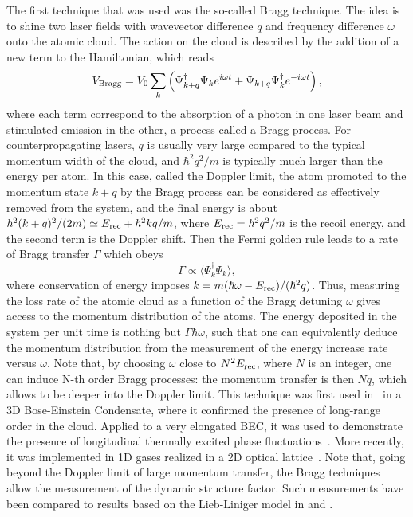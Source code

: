 \documentclass[onecolumn,amsfonts,showpacs,superscriptaddress]{revtex4-1}
\newcommand{\comJ}[1]{{\color{orange}#1}}
\begin{document}
The first technique that was used %
was the so-called Bragg technique. The idea is to shine two laser fields with wavevector difference $q$ and frequency difference $\omega$ onto the atomic cloud. 
The action on the cloud is described by the addition of a new term to the Hamiltonian, which reads 
\begin{equation}
    V_{\rm Bragg} = V_0\sum_k \left ( \Psi_{k+q}^\dagger \Psi_k e^{i\omega t}
    +\Psi_{k+q}\Psi_k^\dagger e^{-i\omega t}
    \right ),
\end{equation}
where each term correspond to the
 absorption of a photon in one laser beam and stimulated emission in the other, a process called a Bragg process. 
 For counterpropagating lasers, 
 $q$ is usually very large compared to the typical momentum width of the cloud, and $\hbar^2q^2/m$ is typically much larger than the energy per atom. In this case, called the Doppler limit, the 
 atom promoted to the momentum state $k+q$ by the Bragg process can be considered as effectively removed from the system, and the
 final energy is about 
 $\hbar^2(k+q)^2/(2m)\simeq E_{\rm rec} + \hbar^2 kq/m$, where $E_{\rm rec}=\hbar^2q^2/m$ is the recoil energy, and the second term is the Doppler shift.
Then the Fermi golden rule leads to a rate of Bragg transfer $\Gamma$ which obeys   %
\begin{equation}
    \Gamma \propto \langle \Psi_k^\dagger \Psi_k\rangle ,
\end{equation}
where conservation of energy imposes
$k=m (\hbar \omega-E_{\rm rec})/(\hbar^2 q)$.
Thus, measuring the loss rate of the atomic cloud as a function of the Bragg detuning $\omega$ gives access to the momentum distribution of the atoms. The energy deposited in the system per unit time is nothing but $\Gamma \hbar\omega$, such that one can 
equivalently deduce the momentum distribution from the measurement of  the energy increase rate versus $\omega$.
Note that, by choosing $\omega$
close to $N^2E_{\rm rec}$, where $N$ is an integer, one can induce N-th order Bragg processes: the momentum transfer is then $Nq$, which allows to be deeper into the Doppler limit. This technique was first used in~\citep{stenger_bragg_1999} in a 3D Bose-Einstein Condensate, where it confirmed the presence of long-range order in the cloud. Applied to a very elongated BEC, it was used to demonstrate the presence of longitudinal thermally excited phase fluctuations~\citep{richard_momentum_2003}. More recently, it was implemented in 1D gases realized in a 2D optical lattice~\citep{fabbri_momentum-resolved_2011}. 
Note that, going beyond the Doppler limit of large momentum transfer, the Bragg techniques allow the measurement of the dynamic structure factor. Such measurements have been compared to results based on the Lieb-Liniger model in \citep{fabbri_dynamical_2015} and \citep{meinert_probing_2015}.
\end{document}
